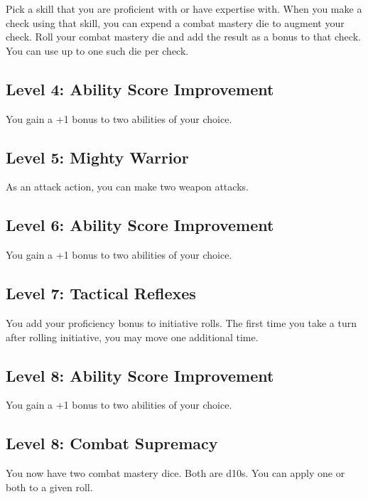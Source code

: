 \documentclass[12pt,letterpaper,twocolumn,openany,nodeprecatedcode,bg=none]{dndbook}
\begin{document}
Pick a skill that you are proficient with or have expertise with. When
you make a check using that skill, you can expend a combat mastery die
to augment your check. Roll your combat mastery die and add the result
as a bonus to that check. You can use up to one such die per check.

\subsection{Level 4: Ability Score
Improvement}\label{level-4-ability-score-improvement}

You gain a +1 bonus to two abilities of your choice.

\subsection{Level 5: Mighty Warrior}\label{level-5-mighty-warrior}

As an attack action, you can make two weapon attacks.

\subsection{Level 6: Ability Score
Improvement}\label{level-6-ability-score-improvement}

You gain a +1 bonus to two abilities of your choice.

\subsection{Level 7: Tactical Reflexes}\label{level-7-tactical-reflexes}

You add your proficiency bonus to initiative rolls. The first time you
take a turn after rolling initiative, you may move one additional time.

\subsection{Level 8: Ability Score
Improvement}\label{level-8-ability-score-improvement}

You gain a +1 bonus to two abilities of your choice.

\subsection{Level 8: Combat Supremacy}\label{level-8-combat-supremacy}

You now have two combat mastery dice. Both are d10s. You can apply one
or both to a given roll.
\end{document}
